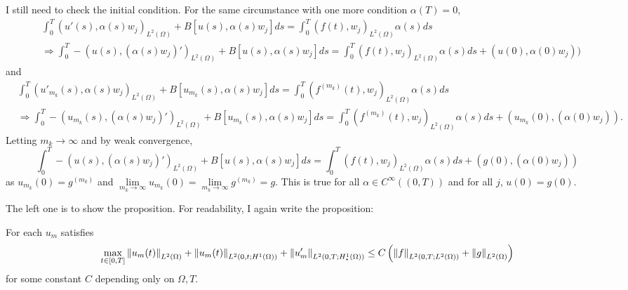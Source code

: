 \documentclass{article}
\begin{document}
\begin{enumerate}
I still need to check the initial condition. For the same circumstance with one more condition $\alpha(T)=0$,
\begin{equation*}
\begin{split}
&\int_0^T (u'(s),\alpha(s)w_j)_{L^2(\Omega)}+B[u(s),\alpha(s)w_j]ds=\int_0^T (f(t),w_j)_{L^2(\Omega)}\alpha(s)ds \\
&\Rightarrow \int_0^T -(u(s),(\alpha(s)w_j)')_{L^2(\Omega)}+B[u(s),\alpha(s)w_j]ds=\int_0^T (f(t),w_j)_{L^2(\Omega)}\alpha(s)ds+(u(0),\alpha(0)w_j))
\end{split}
\end{equation*}
and
\begin{equation*}
\begin{split}
&\int_0^T (u'_{m_k}(s),\alpha(s)w_j)_{L^2(\Omega)}+B[u_{m_k}(s),\alpha(s)w_j]ds=\int_0^T (f^{(m_k)}(t),w_j)_{L^2(\Omega)}\alpha(s)ds \\
&\Rightarrow \int_0^T -(u_{m_k}(s),(\alpha(s)w_j)')_{L^2(\Omega)}+B[u_{m_k}(s),\alpha(s)w_j]ds=\int_0^T (f^{(m_k)}(t),w_j)_{L^2(\Omega)}\alpha(s)ds+(u_{m_k}(0),(\alpha(0)w_j)).
\end{split}
\end{equation*}
Letting $m_k\rightarrow\infty$ and by weak convergence,
\begin{equation*}
\int_0^T -(u(s),(\alpha(s)w_j)')_{L^2(\Omega)}+B[u(s),\alpha(s)w_j]ds=\int_0^T (f(t),w_j)_{L^2(\Omega)}\alpha(s)ds+(g(0),(\alpha(0)w_j))
\end{equation*}
as $u_{m_k}(0)=g^{(m_k)}$ and $\lim\limits_{m_k\rightarrow\infty} u_{m_k}(0)=\lim\limits_{m_k\rightarrow\infty}g^{(m_k)}=g$. This is true for all $\alpha\in C^\infty((0, T))$ and for all $j$, $u(0)=g(0)$.

The left one is to show the proposition. For readability, I again write the proposition:

For each $u_m$ satisfies
\begin{equation*}
\max_{t\in [0,T]}\norm{u_m(t)}_{L^2(\Omega)}+\norm{u_m(t)}_{L^2(0, t;H^1(\Omega))}+\norm{u'_m}_{L^2(0,T;H	_*^1(\Omega))}\leq C\left(\norm{f}_{L^2(0,T;L^2(\Omega))}+\norm{g}_{L^2(\Omega)}\right)
\end{equation*}
for some constant $C$ depending only on $\Omega,T$.


\end{enumerate}
\end{document}
